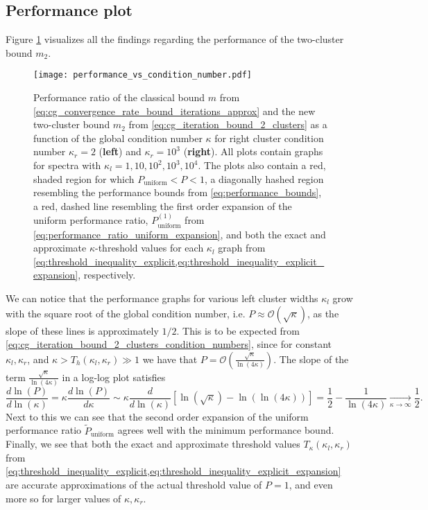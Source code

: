 \subsection{Performance plot}
Figure \ref{fig:two_cluster_bound_performance} visualizes all the findings regarding the performance of the two-cluster bound $m_2$. 
\begin{figure}[H]
    \centering
    \texttt{[image: performance\_vs\_condition\_number.pdf]}
    \caption{Performance ratio of the classical bound $m$ from \cref{eq:cg_convergence_rate_bound_iterations_approx} and the new two-cluster bound $m_2$ from \cref{eq:cg_iteration_bound_2_clusters} as a function of the global condition number $\kappa$ for right cluster condition number $\kappa_r = 2$ (\textbf{left}) and $\kappa_r = 10^3$ (\textbf{right}). All plots contain graphs for spectra with $\kappa_l = 1, 10, 10^2, 10^3, 10^4$. The plots also contain a red, shaded region for which $P_{\text{uniform}} < P < 1$, a diagonally hashed region resembling the performance bounds from \cref{eq:performance_bounds}, a red, dashed line resembling the first order expansion of the uniform performance ratio, $P^{(1)}_{\text{uniform}}$ from \cref{eq:performance_ratio_uniform_expansion}, and both the exact and approximate $\kappa$-threshold values for each $\kappa_l$ graph from \cref{eq:threshold_inequality_explicit,eq:threshold_inequality_explicit_expansion}, respectively.}
    \label{fig:two_cluster_bound_performance}
\end{figure}
We can notice that the performance graphs for various left cluster widths $\kappa_l$ grow with the square root of the global condition number, i.e. $P \approx \mathcal{O}(\sqrt{\kappa})$, as the slope of these lines is approximately $1/2$. This is to be expected from \cref{eq:cg_iteration_bound_2_clusters_condition_numbers}, since for constant $\kappa_l,\kappa_r$, and $\kappa > T_h(\kappa_l, \kappa_r) \gg 1$ we have that $P = \mathcal{O}\left(\frac{\sqrt{\kappa}}{\ln(4\kappa)}\right)$. The slope of the term $\frac{\sqrt{\kappa}}{\ln(4\kappa)}$ in a log-log plot satisfies
\[
    \frac{d\ln(P)}{d\ln(\kappa)} =\kappa\frac{d\ln(P)}{d\kappa} \sim \kappa\frac{d}{d\ln(\kappa)} \left[\ln(\sqrt{\kappa}) - \ln(\ln(4\kappa))\right] = \frac{1}{2} - \frac{1}{\ln(4\kappa)} \underset{\kappa\to\infty}{\longrightarrow} \frac{1}{2}.
\]
Next to this we can see that the second order expansion of the uniform performance ratio $\tilde{P}_{\text{uniform}}$ agrees well with the minimum performance bound. Finally, we see that both the exact and approximate threshold values $T_{\kappa}(\kappa_l, \kappa_r)$ from \cref{eq:threshold_inequality_explicit,eq:threshold_inequality_explicit_expansion} are accurate approximations of the actual threshold value of $P=1$, and even more so for larger values of $\kappa,\kappa_r$.

